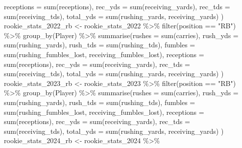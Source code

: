\documentclass[
  letterpaper,
  DIV=11,
  numbers=noendperiod]{scrartcl}
\newenvironment{Shaded}{\begin{snugshade}}{\end{snugshade}}
\newcommand{\AttributeTok}[1]{\textcolor[rgb]{0.40,0.45,0.13}{#1}}
\newcommand{\FunctionTok}[1]{\textcolor[rgb]{0.28,0.35,0.67}{#1}}
\newcommand{\NormalTok}[1]{\textcolor[rgb]{0.00,0.23,0.31}{#1}}
\newcommand{\OtherTok}[1]{\textcolor[rgb]{0.00,0.23,0.31}{#1}}
\newcommand{\SpecialCharTok}[1]{\textcolor[rgb]{0.37,0.37,0.37}{#1}}
\newcommand{\StringTok}[1]{\textcolor[rgb]{0.13,0.47,0.30}{#1}}
\begin{document}
\begin{Shaded}
\begin{Highlighting}[]
            \AttributeTok{receptions =} \FunctionTok{sum}\NormalTok{(receptions),}
            \AttributeTok{rec\_yds =} \FunctionTok{sum}\NormalTok{(receiving\_yards),}
            \AttributeTok{rec\_tds =} \FunctionTok{sum}\NormalTok{(receiving\_tds),}
            \AttributeTok{total\_yds =} \FunctionTok{sum}\NormalTok{(rushing\_yards, receiving\_yards)}
\NormalTok{  )}
\NormalTok{rookie\_stats\_2022\_rb }\OtherTok{\textless{}{-}}\NormalTok{ rookie\_stats\_2022 }\SpecialCharTok{\%\textgreater{}\%}
  \FunctionTok{filter}\NormalTok{(position }\SpecialCharTok{==} \StringTok{"RB"}\NormalTok{) }\SpecialCharTok{\%\textgreater{}\%}
  \FunctionTok{group\_by}\NormalTok{(Player) }\SpecialCharTok{\%\textgreater{}\%}
  \FunctionTok{summarise}\NormalTok{(}\AttributeTok{rushes =} \FunctionTok{sum}\NormalTok{(carries),}
            \AttributeTok{rush\_yds =} \FunctionTok{sum}\NormalTok{(rushing\_yards),}
            \AttributeTok{rush\_tds =} \FunctionTok{sum}\NormalTok{(rushing\_tds),}
            \AttributeTok{fumbles =} \FunctionTok{sum}\NormalTok{(rushing\_fumbles\_lost, receiving\_fumbles\_lost),}
            \AttributeTok{receptions =} \FunctionTok{sum}\NormalTok{(receptions),}
            \AttributeTok{rec\_yds =} \FunctionTok{sum}\NormalTok{(receiving\_yards),}
            \AttributeTok{rec\_tds =} \FunctionTok{sum}\NormalTok{(receiving\_tds),}
            \AttributeTok{total\_yds =} \FunctionTok{sum}\NormalTok{(rushing\_yards, receiving\_yards)}
\NormalTok{  )}
\NormalTok{rookie\_stats\_2023\_rb }\OtherTok{\textless{}{-}}\NormalTok{ rookie\_stats\_2023 }\SpecialCharTok{\%\textgreater{}\%}
  \FunctionTok{filter}\NormalTok{(position }\SpecialCharTok{==} \StringTok{"RB"}\NormalTok{) }\SpecialCharTok{\%\textgreater{}\%}
  \FunctionTok{group\_by}\NormalTok{(Player) }\SpecialCharTok{\%\textgreater{}\%}
  \FunctionTok{summarise}\NormalTok{(}\AttributeTok{rushes =} \FunctionTok{sum}\NormalTok{(carries),}
            \AttributeTok{rush\_yds =} \FunctionTok{sum}\NormalTok{(rushing\_yards),}
            \AttributeTok{rush\_tds =} \FunctionTok{sum}\NormalTok{(rushing\_tds),}
            \AttributeTok{fumbles =} \FunctionTok{sum}\NormalTok{(rushing\_fumbles\_lost, receiving\_fumbles\_lost),}
            \AttributeTok{receptions =} \FunctionTok{sum}\NormalTok{(receptions),}
            \AttributeTok{rec\_yds =} \FunctionTok{sum}\NormalTok{(receiving\_yards),}
            \AttributeTok{rec\_tds =} \FunctionTok{sum}\NormalTok{(receiving\_tds),}
            \AttributeTok{total\_yds =} \FunctionTok{sum}\NormalTok{(rushing\_yards, receiving\_yards)}
\NormalTok{  )}
\NormalTok{rookie\_stats\_2024\_rb }\OtherTok{\textless{}{-}}\NormalTok{ rookie\_stats\_2024 }\SpecialCharTok{\%\textgreater{}\%}

\end{Highlighting}
\end{Shaded}
\end{document}
